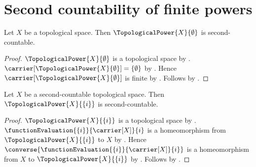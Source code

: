 \section{Second countability of finite powers}





\begin{theorem}\label{empty_topological_power_is_second_countable}
    Let $X$ be a topological space.
    Then $\TopologicalPower{X}{\emptyset}$ is second-countable.
\end{theorem}
\begin{proof}
    $\TopologicalPower{X}{\emptyset}$ is a topological space by
        .
    $\carrier[\TopologicalPower{X}{\emptyset}]=\{\emptyset\}$ by
        .
    Hence $\carrier[\TopologicalPower{X}{\emptyset}]$ is finite by .
    Follows by .
\end{proof}

\begin{theorem}\label{singleton_topological_power_is_second_countable}
    Let $X$ be a second-countable topological space.
    Then $\TopologicalPower{X}{\{i\}}$ is second-countable.
\end{theorem}
\begin{proof}
    $\TopologicalPower{X}{\{i\}}$ is a topological space by
        .
    $\functionEvaluation{\{i\}}{\carrier[X]}{i}$ is a homeomorphism from
        $\TopologicalPower{X}{\{i\}}$ to $X$ by .
    Hence $\converse{\functionEvaluation{\{i\}}{\carrier[X]}{i}}$ is a homeomorphism
        from $X$ to $\TopologicalPower{X}{\{i\}}$ by .
    Follows by .
\end{proof}


